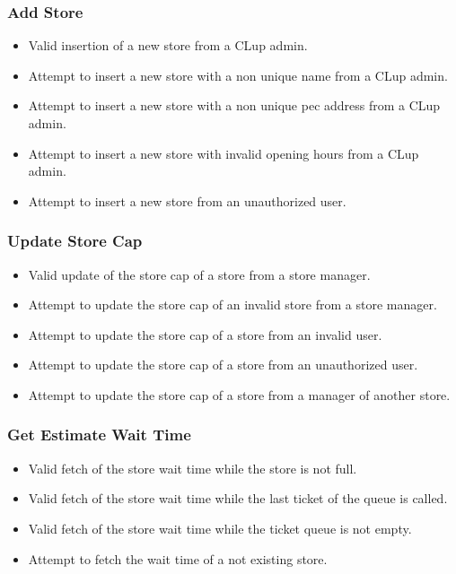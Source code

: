 \subsubsection{Add Store}
\begin{itemize}
	\item Valid insertion of a new store from a CLup admin.
	\item Attempt to insert a new store with a non unique name from a CLup admin.
	\item Attempt to insert a new store with a non unique pec address from a CLup admin.
	\item Attempt to insert a new store with invalid opening hours from a CLup admin.
	\item Attempt to insert a new store from an unauthorized user.
\end{itemize}

\subsubsection{Update Store Cap}
\begin{itemize}
	\item Valid update of the store cap of a store from a store manager.
	\item Attempt to update the store cap of an invalid store from a store manager.
	\item Attempt to update the store cap of a store from an invalid user.
	\item Attempt to update the store cap of a store from an unauthorized user.
	\item Attempt to update the store cap of a store from a manager of another store.
\end{itemize}

\subsubsection{Get Estimate Wait Time}
\begin{itemize}
	\item Valid fetch of the store wait time while the store is not full.
	\item Valid fetch of the store wait time while the last ticket of the queue is called.
	\item Valid fetch of the store wait time while the ticket queue is not empty.
	\item Attempt to fetch the wait time of a not existing store.
\end{itemize}

